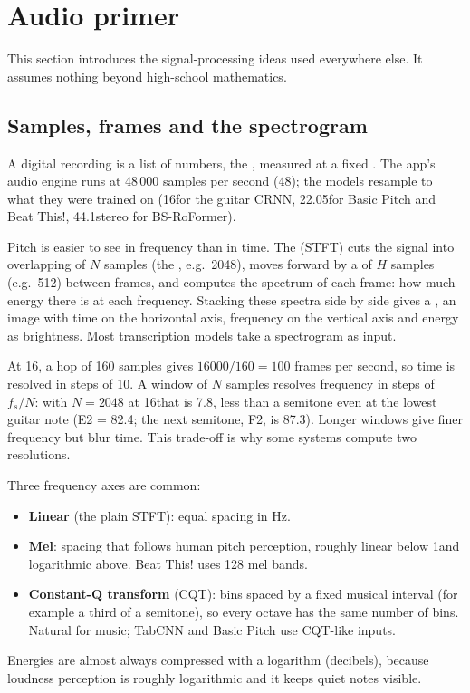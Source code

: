 \section{Audio primer}
\label{sec:audio}

This section introduces the signal-processing ideas used everywhere else. It
assumes nothing beyond high-school mathematics.

\subsection{Samples, frames and the spectrogram}

A digital recording is a list of numbers, the , measured at a
fixed . The app's audio engine runs at 48\,000 samples per
second (48\kHz); the models resample to what they were trained on (16\kHz for
the guitar CRNN, 22.05\kHz for Basic Pitch and Beat This!, 44.1\kHz stereo for
BS-RoFormer).

Pitch is easier to see in frequency than in time. The  (STFT) cuts the signal into overlapping  of $N$ samples
(the , e.g.\ 2048), moves forward by a  of $H$ samples
(e.g.\ 512) between frames, and computes the spectrum of each frame: how much
energy there is at each frequency. Stacking these spectra side by side gives a
, an image with time on the horizontal axis, frequency on the
vertical axis and energy as brightness. Most transcription models take a
spectrogram as input.

\begin{worked}[: resolution]
At 16\kHz, a hop of 160 samples gives $16000/160 = 100$ frames per second, so
time is resolved in steps of 10\ms. A window of $N$ samples resolves frequency
in steps of $f_s/N$: with $N=2048$ at 16\kHz that is 7.8\Hz, less than a
semitone even at the lowest guitar note (E2 = 82.4\Hz; the next semitone, F2, is
87.3\Hz). Longer windows give finer frequency but blur time. This trade-off is
why some systems compute two resolutions.
\end{worked}

Three frequency axes are common:
\begin{itemize}
\item \textbf{Linear} (the plain STFT): equal spacing in Hz.
\item \textbf{Mel}: spacing that follows human pitch perception, roughly linear
  below 1\kHz and logarithmic above. Beat This! uses 128 mel bands.
\item \textbf{Constant-Q transform} (CQT): bins spaced by a fixed musical
  interval (for example a third of a semitone), so every octave has the same
  number of bins. Natural for music; TabCNN and Basic Pitch use CQT-like inputs.
\end{itemize}
Energies are almost always compressed with a logarithm (decibels), because
loudness perception is roughly logarithmic and it keeps quiet notes visible.

